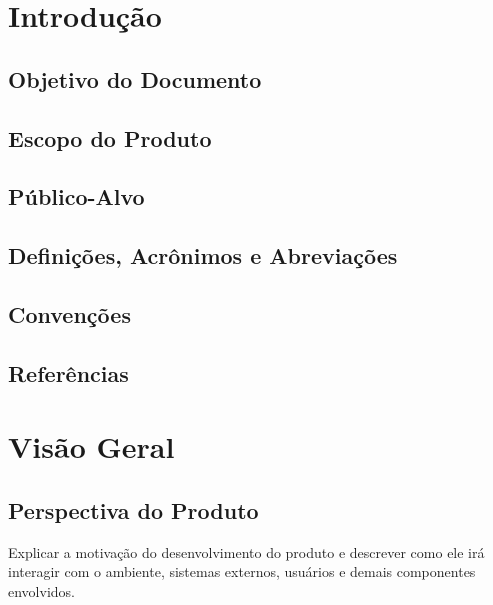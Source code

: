 \documentclass[12pt,a4paper]{article}
\begin{document}
\newpage

\section{Introdução}


\subsection{Objetivo do Documento}


\subsection{Escopo do Produto}


\subsection{Público-Alvo}


\subsection{Definições, Acrônimos e Abreviações}


\subsection{Convenções}


\subsection{Referências}
\nocite{*}
\printbibliography[heading=none]




\newpage
\section{Visão Geral}

\subsection{Perspectiva do Produto}
Explicar a motivação do desenvolvimento do produto e descrever como ele irá interagir com o ambiente, sistemas externos, usuários e demais componentes envolvidos.
\end{document}
